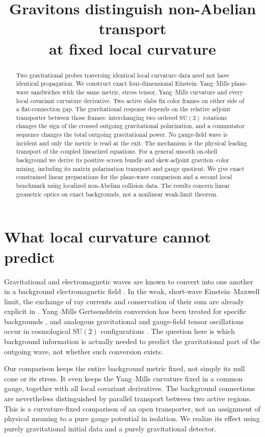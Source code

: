 \documentclass[11pt]{article}
\title{Gravitons distinguish non-Abelian transport\\at fixed local curvature}
\author{}
\date{}
\begin{document}
\maketitle
\begin{abstract}
Two gravitational probes traversing identical local curvature data need not have identical propagation. We construct exact four-dimensional Einstein--Yang--Mills plane-wave sandwiches with the same metric, stress tensor, Yang--Mills curvature and every local covariant curvature derivative. Two active slabs fix color frames on either side of a flat-connection gap. The gravitational response depends on the relative adjoint transporter between those frames: interchanging two ordered \(\mathrm{SU}(2)\) rotations changes the sign of the crossed outgoing gravitational polarization, and a commutator sequence changes the total outgoing gravitational power. No gauge-field wave is incident and only the metric is read at the exit. The mechanism is the physical leading transport of the coupled linearized equations. For a general smooth on-shell background we derive its positive screen bundle and skew-adjoint graviton--color mixing, including its matrix polarization transport and gauge quotient. We give exact constrained linear preparations for the plane-wave comparison and a second local benchmark using localized non-Abelian collision data. The results concern linear geometric optics on exact backgrounds, not a nonlinear weak-limit theorem.
\end{abstract}

\section{What local curvature cannot predict}

Gravitational and electromagnetic waves are known to convert into one another in a background electromagnetic field \cite{gert}. In the weak, short-wave Einstein--Maxwell limit, the exchange of ray currents and conservation of their sum are already explicit in \cite{tokuoka}. Yang--Mills Gertsenshtein conversion has been treated for specific backgrounds \cite{prym}, and analogous gravitational and gauge-field tensor oscillations occur in cosmological \(\mathrm{SU}(2)\) configurations \cite{bc,cdm}. The question here is which background information is actually needed to predict the gravitational part of the outgoing wave, not whether such conversion exists.

Our comparison keeps the entire background metric fixed, not simply its null cone or its stress. It even keeps the Yang--Mills curvature fixed in a common gauge, together with all local covariant derivatives. The background connections are nevertheless distinguished by parallel transport between two active regions. This is a curvature-fixed comparison of an open transporter, not an assignment of physical meaning to a pure gauge potential in isolation. We realize its effect using purely gravitational initial data and a purely gravitational detector.
\end{document}
